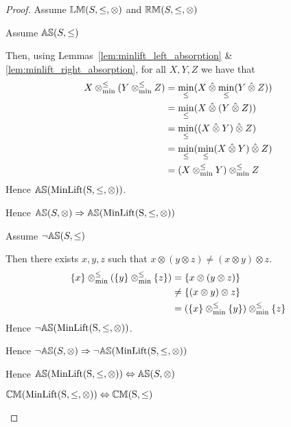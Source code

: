 \begin{proof}
Assume ${\mathbb{LM}}(S,\leq,\otimes)$ and ${\mathbb{RM}}(S,\leq,\otimes)$

Assume ${\mathbb{AS}}(S,\leq)$
\begin{ind}
Then, using Lemmas~\ref{lem:minlift_left_absorption} \& \ref{lem:minlift_right_absorption}, for all $X,Y,Z$ we have that
\begin{align*}
X \mathbin{\otimes_{\min}^{\leq}} (Y \mathbin{\otimes_{\min}^{\leq}} Z) 	& = \min_\leq(X \mathbin{\hat{\otimes}} \min_\leq(Y \mathbin{\hat{\otimes}} Z)) \\
							& = \min_\leq(X \mathbin{\hat{\otimes}} (Y \mathbin{\hat{\otimes}} Z)) \\
							& = \min_\leq((X \mathbin{\hat{\otimes}} Y) \mathbin{\hat{\otimes}} Z) \\
							& = \min_\leq(\min_\leq(X \mathbin{\hat{\otimes}} Y) \mathbin{\hat{\otimes}} Z) \\
							& = (X \mathbin{\otimes_{\min}^{\leq}} Y) \mathbin{\otimes_{\min}^{\leq}} Z
\end{align*}
Hence ${\mathbb{AS}}(\mathrm{MinLift(S,\leq,\otimes)})$.
\end{ind}
Hence ${\mathbb{AS}}(S,\otimes) \Rightarrow {\mathbb{AS}}(\mathrm{MinLift(S,\leq,\otimes)})$

\vspace{2em}


Assume $\neg {\mathbb{AS}}(S,\leq)$

\begin{ind}
Then there exists $x,y,z$ such that $x \otimes (y \otimes z) \neq (x \otimes y) \otimes z$.
\begin{align*}
\{ x \} \mathbin{\otimes_{\min}^{\leq}} (\{ y \} \mathbin{\otimes_{\min}^{\leq}} \{ z \}) 	& = \{x \otimes (y \otimes z)\} \\	
												& \neq \{ (x \otimes y) \otimes z \} \\
												& = (\{ x \} \mathbin{\otimes_{\min}^{\leq}} \{ y \}) \mathbin{\otimes_{\min}^{\leq}} \{ z \}
\end{align*}
Hence $\neg {\mathbb{AS}}(\mathrm{MinLift(S,\leq,\otimes)})$.
\end{ind}
Hence $\neg {\mathbb{AS}}(S,\otimes) \Rightarrow \neg {\mathbb{AS}}(\mathrm{MinLift(S,\leq,\otimes)})$

\vspace{2em}

Hence ${\mathbb{AS}}(\mathrm{MinLift(S,\leq,\otimes)}) \Leftrightarrow {\mathbb{AS}}(S,\otimes)$






\begin{theorem} \label{thm:minlift_cm}
${\mathbb{CM}}(\mathrm{MinLift(S,\leq,\otimes)}) \Leftrightarrow {\mathbb{CM}}\mathrm{(S,\leq)}$
\end{theorem}


\end{proof}
